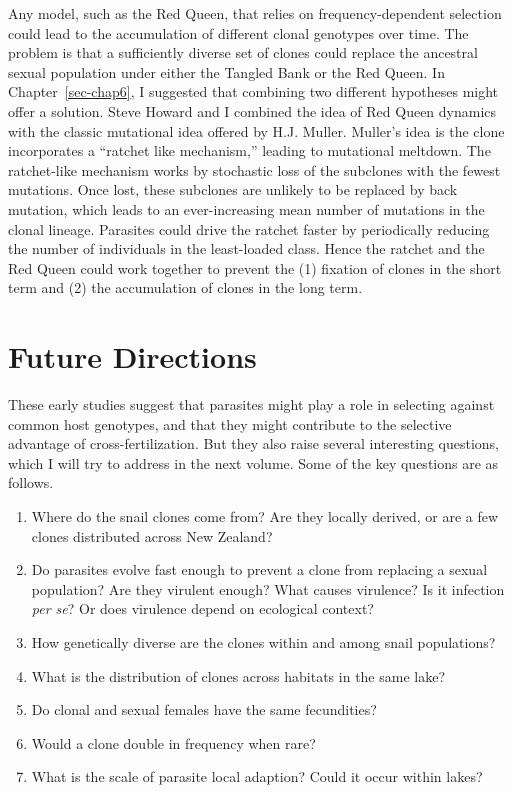 \documentclass[
  letterpaper,
]{book}
\providecommand{\tightlist}{%
  \setlength{\itemsep}{0pt}\setlength{\parskip}{0pt}}\usepackage{longtable,booktabs,array}
\begin{document}
Any model, such as the Red Queen, that relies on frequency-dependent
selection could lead to the accumulation of different clonal genotypes
over time. The problem is that a sufficiently diverse set of clones
could replace the ancestral sexual population under either the Tangled
Bank or the Red Queen. In Chapter~\ref{sec-chap6}, I suggested that
combining two different hypotheses might offer a solution. Steve Howard
and I combined the idea of Red Queen dynamics with the classic
mutational idea offered by H.J. Muller. Muller's idea is the clone
incorporates a ``ratchet like mechanism,'' leading to mutational
meltdown. The ratchet-like mechanism works by stochastic loss of the
subclones with the fewest mutations. Once lost, these subclones are
unlikely to be replaced by back mutation, which leads to an
ever-increasing mean number of mutations in the clonal lineage.
Parasites could drive the ratchet faster by periodically reducing the
number of individuals in the least-loaded class. Hence the ratchet and
the Red Queen could work together to prevent the (1) fixation of clones
in the short term and (2) the accumulation of clones in the long term.

\section{Future Directions}\label{future-directions}

These early studies suggest that parasites might play a role in
selecting against common host genotypes, and that they might contribute
to the selective advantage of cross-fertilization. But they also raise
several interesting questions, which I will try to address in the next
volume. Some of the key questions are as follows.

\begin{enumerate}
\def\labelenumi{\arabic{enumi}.}
\tightlist
\item
  Where do the snail clones come from? Are they locally derived, or are
  a few clones distributed across New Zealand?
\item
  Do parasites evolve fast enough to prevent a clone from replacing a
  sexual population? Are they virulent enough? What causes virulence? Is
  it infection \emph{per se}? Or does virulence depend on ecological
  context?
\item
  How genetically diverse are the clones within and among snail
  populations?
\item
  What is the distribution of clones across habitats in the same lake?
\item
  Do clonal and sexual females have the same fecundities?
\item
  Would a clone double in frequency when rare?
\item
  What is the scale of parasite local adaption? Could it occur within
  lakes?
\end{enumerate}
\end{document}
